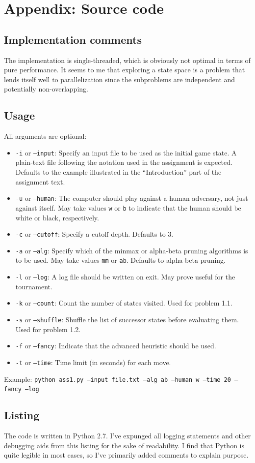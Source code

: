 \documentclass[letterpaper, 10pt]{article}
\numberwithin{theorem}{section}
\begin{document}
\clearpage
\appendix
\section{Appendix: Source code}
\subsection{Implementation comments}
The implementation is single-threaded, which is obviously not optimal in terms of pure performance. It seems to me that exploring a state space is a problem that lends itself well to parallelization since the subproblems are independent and potentially non-overlapping.

\subsection{Usage}
All arguments are optional:
\begin{itemize}
	\item \texttt{-i} or \texttt{--input}: Specify an input file to be used as the initial game state. A plain-text file following the notation used in the assignment is expected. Defaults to the example illustrated in the ``Introduction'' part of the assignment text.
	\item \texttt{-u} or \texttt{--human}: The computer should play against a human adversary, not just against itself. May take values \texttt{w} or \texttt{b} to indicate that the human should be white or black, respectively. 
	\item \texttt{-c} or \texttt{--cutoff}: Specify a cutoff depth. Defaults to 3.
	\item \texttt{-a} or \texttt{--alg}: Specify which of the minmax or alpha-beta pruning algorithms is to be used. May take values \texttt{mm} or \texttt{ab}. Defaults to alpha-beta pruning.
	\item \texttt{-l} or \texttt{--log}: A log file should be written on exit. May prove useful for the tournament.
	\item \texttt{-k} or \texttt{--count}: Count the number of states visited. Used for problem 1.1.
	\item \texttt{-s} or \texttt{--shuffle}: Shuffle the list of successor states before evaluating them. Used for problem 1.2.
	\item \texttt{-f} or \texttt{--fancy}: Indicate that the advanced heuristic should be used. 
	\item \texttt{-t} or \texttt{--time}: Time limit (in seconds) for each move.
\end{itemize}
Example: \texttt{python ass1.py --input file.txt --alg ab --human w --time 20 --fancy --log}

\subsection{Listing}
The code is written in Python 2.7. I've expunged all logging statements and other debugging aids from this listing for the sake of readability. I find that Python is quite legible in most cases, so I've primarily added comments to explain purpose.

\end{document}
